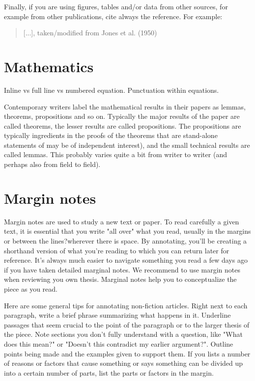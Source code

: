 Finally, if you are using figures, tables and/or data from other sources, for example from other publications, cite always the reference. 
For example: \\
\blockquote{[...], taken/modified from Jones et al. (1950)}

\section{Mathematics}
Inline vs full line vs numbered equation.
Punctuation within equations.

Contemporary writers label the mathematical results in their papers as lemmas, theorems, propositions and so on.
Typically the major results of the paper are called theorems, the lesser results are called propositions.
The propositions are typically ingredients in the proofs of the theorems that are stand-alone statements of may be of independent interest), and the small technical results are called lemmas.
This probably varies quite a bit from writer to writer (and perhaps also from field to field).

\section{Margin notes}
Margin notes are used to study a new text or paper.
To read carefully a given text, it is essential that you write "all over" what you read, usually in the margins or between the lines?wherever there is space.
By annotating, you'll be creating a shorthand version of what you're reading to which you can return later for reference.
It's always much easier to navigate something you read a few days ago if you have taken detailed marginal notes.
We recommend to use margin notes when reviewing you own thesis.
Marginal notes help you to conceptualize the piece as you read.

Here are some general tips for annotating non-fiction articles.
Right next to each paragraph, write a brief phrase summarizing what happens in it. 
Underline passages that seem crucial to the point of the paragraph or to the larger thesis of the piece.
Note sections you don't fully understand with a question, like "What does this mean?" or "Doesn't this contradict my earlier argument?".
Outline points being made and the examples given to support them.
If you lists a number of reasons or factors that cause something or says something can be divided up into a certain number of parts, list the parts or factors in the margin.

